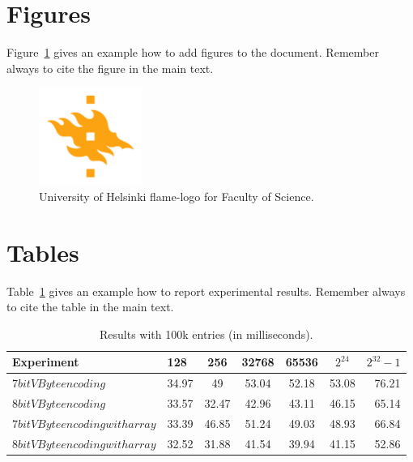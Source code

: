 \section{Figures}
Figure~\ref{fig:logo} gives an example how to add figures to the document. Remember always to cite the figure in the main text.

\begin{figure}[h!] 
\centering 
\includegraphics[width=0.3\textwidth]{HY-logo-ml.png}
\caption{University of Helsinki flame-logo for Faculty of Science.\label{fig:logo}}
\end{figure}

\section{Tables}

Table~\ref{table:results} gives an example how to report experimental results. Remember always to cite the table in the main text. 

\begin{table}
\centering
\caption{Results with 100k entries (in milliseconds).\label{table:results}}
\begin{tabular}{l||l c c c c r} 
Experiment & 128 & 256 & 32768 & 65536 & $2^{24}$ & $2^{32} -1$\\ 
\hline \hline 
$7bit VByte encoding$ & 34.97 & 49 & 53.04 & 52.18 & 53.08 & 76.21\\
$8bit VByte encoding$ & 33.57 & 32.47 & 42.96 & 43.11 & 46.15 & 65.14\\
$7bit VByte encoding with array$ & 33.39 & 46.85 & 51.24 & 49.03 & 48.93 & 66.84 \\
$8bit VByte encoding with array$ & 32.52 & 31.88 & 41.54 & 39.94 & 41.15 & 52.86 \\

\hline
%
\end{tabular}
\end{table}

